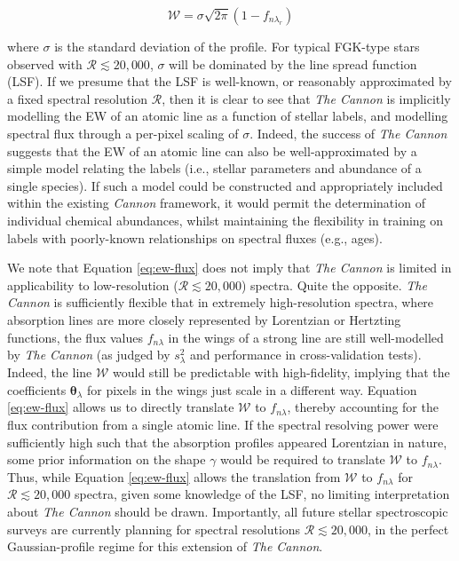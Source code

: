 \documentclass[useAMS,usenatbib]{mn2e}
\newcommand\tc{\textit{The Cannon}}
\newcommand\cv{{\boldsymbol\theta}_\lambda}
\newcommand\ssq{s_\lambda^2}
\begin{document}
\begin{equation}
\mathcal{W} = \sigma{}\sqrt{2\pi}(1 - f_{n\lambda_r})
\label{eq:ew-flux}
\end{equation}

where $\sigma$ is the standard deviation of the profile. For typical FGK-type
stars observed with $\mathcal{R} \lesssim 20,000$, $\sigma$ will be dominated by
the line spread function (LSF). If we presume that the LSF is well-known, or 
reasonably approximated by a fixed spectral resolution $\mathcal{R}$, then it is
clear to see that \tc{} is implicitly modelling the EW of an atomic line as a 
function of stellar labels, and modelling spectral flux through a per-pixel 
scaling of $\sigma$. Indeed, the success of \tc{} suggests that the EW of an 
atomic line can also be well-approximated by a simple model relating the labels 
(i.e., stellar parameters and abundance of a single species). If such a model 
could be constructed and appropriately included within the existing 
\textit{Cannon} framework, it would permit the determination of individual 
chemical abundances, whilst maintaining the flexibility in training on labels 
with poorly-known relationships on spectral fluxes (e.g., ages).

We note that Equation \ref{eq:ew-flux} does not imply that \tc{} is limited in
applicability to low-resolution ($\mathcal{R} \lesssim 20,000$) spectra. Quite 
the opposite. \tc{} is sufficiently flexible that in extremely high-resolution 
spectra, where absorption lines are more closely represented by Lorentzian or
Hertzting functions, the flux values $f_{n\lambda}$ in the wings of a strong 
line are still well-modelled by \tc{} (as judged by $\ssq$ and performance in
cross-validation tests). Indeed, the line $\mathcal{W}$ would still be 
predictable with high-fidelity, implying that the coefficients $\cv$ for pixels
in the wings just scale in a different way. Equation \ref{eq:ew-flux} allows us
to directly translate $\mathcal{W}$ to $f_{n\lambda}$, thereby accounting for 
the flux contribution from a single atomic line. If the spectral resolving power
were sufficiently high such that the absorption profiles appeared Lorentzian in
nature, some prior information on the shape $\gamma$ would be required to 
translate $\mathcal{W}$ to $f_{n\lambda}$. Thus, while Equation \ref{eq:ew-flux}
allows the translation from $\mathcal{W}$ to $f_{n\lambda}$ for 
$\mathcal{R} \lesssim 20,000$ spectra, given some knowledge of the LSF, no 
limiting interpretation about \tc{} should be drawn. Importantly, all future 
stellar spectroscopic surveys are currently planning for spectral resolutions
$\mathcal{R} \lesssim 20,000$, in the perfect Gaussian-profile regime for this
extension of \tc{}.
\end{document}
